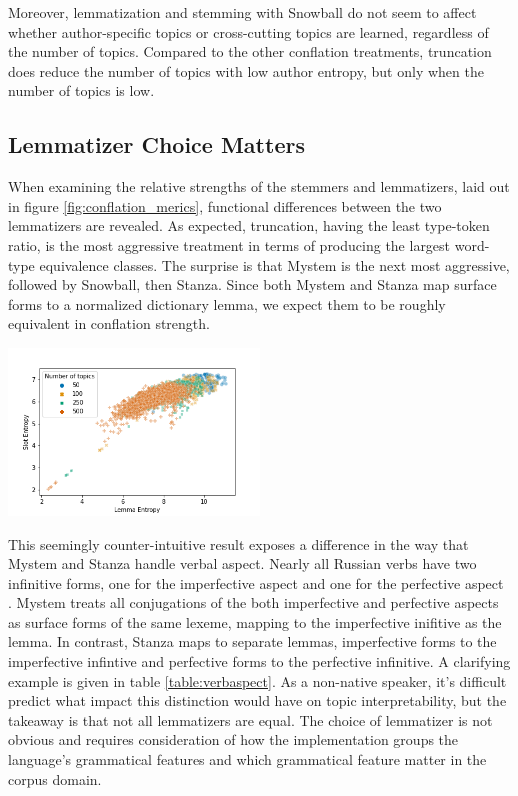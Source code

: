 \documentclass[11pt,a4paper]{article}
\begin{document}
Moreover, lemmatization and stemming with Snowball do not seem to affect whether author-specific topics or cross-cutting topics are learned, regardless of the number of topics. Compared to the other conflation treatments, truncation does reduce the number of topics with low author entropy, but only when the number of topics is low.

\subsection{Lemmatizer Choice Matters}
When examining the relative strengths of the stemmers and lemmatizers, laid out in figure \ref{fig:conflation_merics}, functional differences between the two lemmatizers are revealed. As expected, truncation, having the least type-token ratio, is the most aggressive treatment in terms of producing the largest word-type equivalence classes. The surprise is that Mystem is the next most aggressive, followed by Snowball, then Stanza. Since both Mystem and Stanza map surface forms to a normalized dictionary lemma, we expect them to be roughly equivalent in conflation strength.




\begin{center}
    \includegraphics[width=0.5\textwidth]{lemma_slot_entropy_scatter.png}
    \label{fig:lemma_vs_slot_entropy}
\end{center}


This seemingly counter-intuitive result exposes a difference in the way that Mystem and Stanza handle verbal aspect. Nearly all Russian verbs have two infinitive forms, one for the imperfective aspect and one for the perfective aspect \cite{wade2020comprehensive}. Mystem treats all conjugations of the both imperfective and perfective aspects as surface forms of the same lexeme, mapping to the imperfective inifitive as the lemma. In contrast, Stanza maps to separate lemmas, imperfective forms to the imperfective infintive and perfective forms to the perfective infinitive. A clarifying example is given in table \ref{table:verbaspect}. As a non-native speaker, it's difficult predict what impact this distinction would have on topic interpretability, but the takeaway is that not all lemmatizers are equal. The choice of lemmatizer is not obvious and requires consideration of how the implementation groups the language's grammatical features and which grammatical feature matter in the corpus domain.
\end{document}
